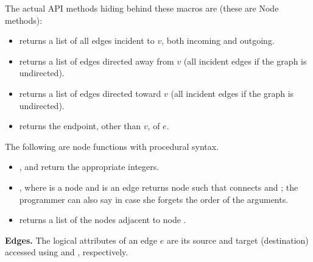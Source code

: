 The actual API methods hiding behind these macros are (these are Node methods):

\begin{itemize}
\item
{} returns a list of all edges
incident to $v$, both incoming and outgoing.
\item
{} returns a list of edges
directed away from $v$ (all incident edges if the graph is undirected).
\item
{} returns a list of edges
directed toward $v$ (all incident edges if the graph is undirected).
\item
{} returns the endpoint, other than $v$, of $e$.
\end{itemize}

The following are node functions with procedural syntax.

\begin{itemize}
\item {},  and  return the appropriate
integers.
\item {}, where  is a node and  is an edge
returns node  such that  connects  and ;
the programmer can also say  in case she forgets the order
of the arguments.
\item {} returns a list of the nodes adjacent to node .
\end{itemize}

\bigskip
\textbf{Edges.}
The logical attributes of an edge $e$ are its source and target (destination)
accessed using  and , respectively.

